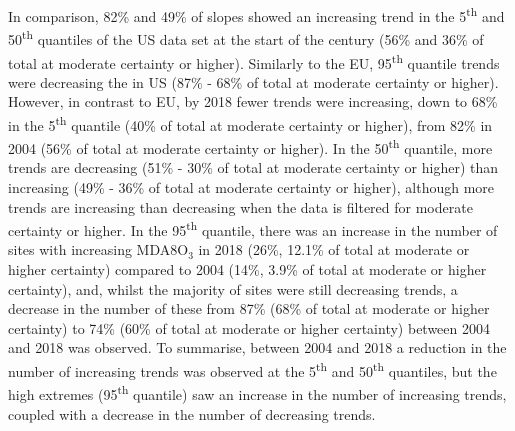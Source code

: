 \documentclass[journal abbreviation, manuscript]{copernicus}
\begin{document}
In comparison, 82\%  and 49\% of slopes showed an increasing trend in the 5\textsuperscript{th} and 50\textsuperscript{th} quantiles of the US data set at the start of the century (56\% and 36\% of total at moderate certainty or higher). Similarly to the EU, 95\textsuperscript{th} quantile trends were decreasing the in US (87\% - 68\% of total at moderate certainty or higher). However, in contrast to EU, by 2018 fewer trends were increasing, down to 68\% in the 5\textsuperscript{th} quantile (40\% of total at moderate certainty or higher), from 82\% in 2004 (56\% of total at moderate certainty or higher). In the 50\textsuperscript{th} quantile, more trends are decreasing (51\% - 30\% of total at moderate certainty or higher) than increasing (49\% - 36\% of total at moderate certainty or higher), although more trends are increasing than decreasing when the data is filtered for moderate certainty or higher. In the 95\textsuperscript{th} quantile, there was an increase in the number of sites with increasing MDA8O$_3$ in 2018 (26\%, 12.1\% of total at moderate or higher certainty) compared to 2004 (14\%, 3.9\% of total at moderate or higher certainty), and, whilst the majority of sites were still decreasing trends, a decrease in the number of these from 87\% (68\% of total at moderate or higher certainty) to 74\% (60\% of total at moderate or higher certainty) between 2004 and 2018 was observed. To summarise, between 2004 and 2018 a reduction in the number of increasing trends was observed at the 5\textsuperscript{th} and 50\textsuperscript{th} quantiles, but the high extremes (95\textsuperscript{th} quantile) saw an increase in the number of increasing trends, coupled with a decrease in the number of decreasing trends.
\end{document}
